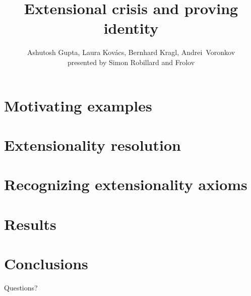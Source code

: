 \documentclass[14pt]{beamer}
\title{Extensional crisis and proving identity}
\author{Ashutosh Gupta, Laura Kovács, Bernhard Kragl, Andrei~Voronkov\\ presented by Simon Robillard and Frolov}
\institute{}
\date{}
\begin{document}
\begin{frame}
  \maketitle
\end{frame}

\section{Motivating examples}


\section{Extensionality resolution}


\section{Recognizing extensionality axioms}


\section{Results}


\section{Conclusions}


\begin{frame}
  \begin{center}
    \Huge{Questions?}
  \end{center}
\end{frame}
\end{document}
